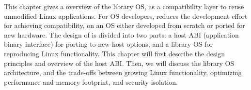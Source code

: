 This chapter gives a overview of the \graphene{} library OS, as a compatibility layer to reuse unmodified Linux applications. For OS developers, \graphene{} reduces the development effort for achieving compatibility,
on an OS either developed from scratch or ported for new hardware.
The design of \graphene{} is divided into two parts: a host ABI (application binary interface) for porting to new host options, and a library OS for reproducing Linux functionality.
This chapter will first describe the design principles and overview of the host ABI. 
Then, we will discuss the library OS architecture, and the trade-offs between growing Linux functionality, optimizing performance and memory footprint, and security isolation.
